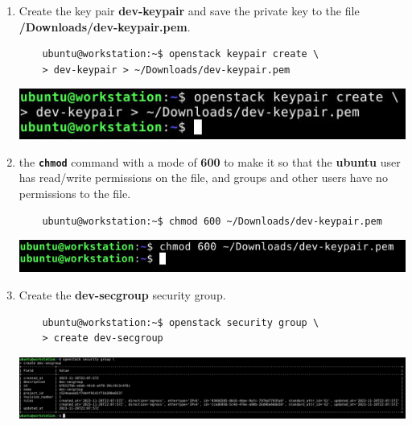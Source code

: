 \documentclass[letterpaper, 12pt]{article}
\begin{document}
\begin{enumerate}
    \item Create the key pair \textbf{dev-keypair} and save the private key to the file
    \textbf{\texttildemid/Downloads/dev-keypair.pem}.
    \begin{lstlisting}
    ubuntu@workstation:~$ openstack keypair create \
    > dev-keypair > ~/Downloads/dev-keypair.pem
    \end{lstlisting}

    \begin{center}
        \includegraphics[width=\linewidth]{images/part1/step13.png}
    \end{center}

    \item the \textbf{\texttt{chmod}} command with a mode of \textbf{600} to make it so that the \textbf{ubuntu} user
    has read/write permissions on the file, and groups and other users have no permissions to the file.
    \begin{lstlisting}
    ubuntu@workstation:~$ chmod 600 ~/Downloads/dev-keypair.pem
    \end{lstlisting}

    \begin{center}
        \includegraphics[width=\linewidth]{images/part1/step14.png}
    \end{center}

    \item Create the \textbf{dev-secgroup} security group.
    \begin{lstlisting}
    ubuntu@workstation:~$ openstack security group \
    > create dev-secgroup
    \end{lstlisting}

    \begin{center}
        \includegraphics[width=\linewidth]{images/part1/step15.png}
    \end{center}


\end{enumerate}
\end{document}
